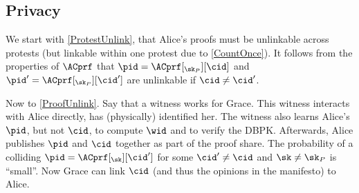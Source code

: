 \subsection{Privacy}

We start with \cref{ProtestUnlink}, that Alice's proofs must be unlinkable 
across protests (but linkable within one protest due to \cref{CountOnce}).
It follows from the properties of \(\ACprf\) that \(\pid = 
  \ACprf[_{\sk_P}][\cid]\) and \(\pid' = \ACprf[_{\sk_P}][\cid']\) are 
unlinkable if \(\cid\neq \cid'\).

Now to \cref{ProofUnlink}.
Say that a witness works for Grace.
This witness interacts with Alice directly, \ie has (physically) identified her.
The witness also learns Alice's \(\pid\), but not \(\cid\), to compute \(\wid\) 
and to verify the \ac{DBPK}.
Afterwards, Alice publishes \(\pid\) and \(\cid\) together as part of the proof 
share.
The probability of a colliding \(\pid = \ACprf[_\sk][\cid']\) for some \(\cid' 
  \neq \cid\) and \(\sk \neq \sk_P\) is \enquote{small}.
Now Grace can link \(\cid\) (and thus the opinions in the manifesto) to Alice.
